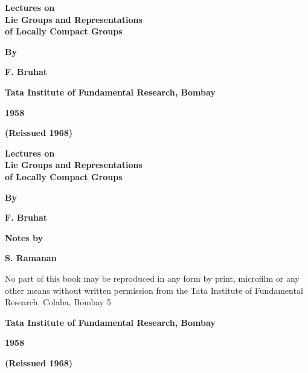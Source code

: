 \thispagestyle{empty}

\begin{center}
{\Large\bf Lectures on}\\[5pt]
{\Large\bf Lie Groups and Representations}\\[5pt]
{\Large\bf of Locally Compact Groups}\\
\vfill


{\bf By}
\medskip

{\large\bf F. Bruhat}
\vfill

{\bf Tata Institute of Fundamental Research, Bombay}

{\bf 1958}

{\bf (Reissued 1968)}
\end{center}
\eject

\thispagestyle{empty}
\begin{center}
{\Large\bf Lectures on}\\[5pt]
{\Large\bf Lie Groups and Representations}\\[5pt]
{\Large\bf of Locally Compact Groups}\\
\vfill


{\bf By}
\medskip

{\large\bf F. Bruhat}
\vfill

{\bf Notes by}
\medskip

{\large\bf S. Ramanan}
\vfill

\parbox{0.7\textwidth}{No part of this book may be reproduced
in any form by print, microfilm or any
other means without written permission
from the Tata Institute of Fundamental
Research, Colaba, Bombay 5}
\vfill

{\bf Tata Institute of Fundamental Research, Bombay}

{\bf 1958}

{\bf (Reissued 1968)}
\end{center}

